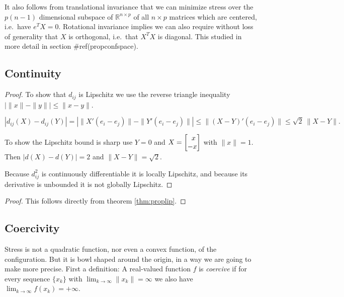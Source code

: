 \documentclass[
  12pt,
]{book}
\theoremstyle{definition}
\theoremstyle{definition}
\theoremstyle{definition}
\theoremstyle{definition}
\theoremstyle{remark}
\begin{document}
It also follows from translational invariance that we can minimize stress over the \(p(n-1)\) dimensional subspace of \(\mathbb{R}^{n\times p}\) of all \(n\times p\) matrices which are centered, i.e.~have \(e^TX=0\). Rotational invariance implies we can also require without loss of generality that \(X\) is orthogonal, i.e.~that \(X^TX\) is diagonal. This studied in more detail in section \#ref(propconfspace).

\hypertarget{propcontinuity}{%
\subsection{Continuity}\label{propcontinuity}}

\begin{proof}
To show that \(d_{ij}\) is Lipschitz we use the reverse triangle inequality
\(|\|x\|-\|y\||\leq\|x - y\|\).

\begin{equation}
|d_{ij}(X)-d_{ij}(Y)|=
|\|X'(e_i-e_j)\|-\|Y'(e_i-e_j)\||
\leq\|(X-Y)'(e_i-e_j)\|\leq\sqrt{2}\ \|X-Y\|.
\label{eq:revtrian}
\end{equation}

To show the Lipschitz bound is sharp use \(Y=0\) and \(X=\begin{bmatrix}\hfill x\\-x\end{bmatrix}\) with \(\|x\|=1\). Then \(|d(X)-d(Y)|=2\) and \(\|X-Y\|=\sqrt{2}\).

Because \(d_{ij}^2\) is continuously differentiable it is locally Lipschitz, and because its derivative is unbounded it is not globally Lipschitz.
\end{proof}

\begin{proof}
This follows directly from theorem \ref{thm:proplip}.
\end{proof}

\hypertarget{propcoercive}{%
\subsection{Coercivity}\label{propcoercive}}

Stress is not a quadratic function, nor even a convex function, of the configuration. But it is bowl shaped around the origin, in a way we are going to make more precise. First a definition: A real-valued function \(f\) is \emph{coercive} if for every sequence \(\{x_k\}\) with \(\lim_{k\rightarrow\infty}\|x_k\|=\infty\) we also have \(\lim_{k\rightarrow\infty}f(x_k)=+\infty\).
\end{document}
